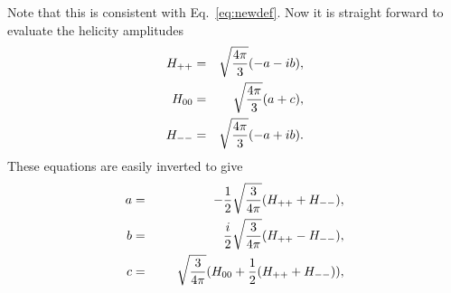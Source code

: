 Note that this is consistent with Eq.~\ref{eq:newdef}.
Now it is straight forward to evaluate the helicity amplitudes
\begin{eqnarray}
 H_{++} & = & \sqrt{4\pi\over 3}(-a-ib), \\
 H_{00} & = & \sqrt{4\pi\over 3}(a+c),\\
 H_{--} & = & \sqrt{4\pi\over 3}(-a+ib).
\end{eqnarray}
These equations are easily inverted to give
\begin{eqnarray}
 a & = & -{1\over2}\sqrt{3\over 4\pi}(H_{++}+H_{--}), \\
 b & = & \phantom{-}{i\over2}\sqrt{3\over 4\pi}(H_{++}-H_{--}), \\
 c & = & \phantom{-{1\over2}}\sqrt{3\over 4\pi}(H_{00}+{1\over 2}(H_{++}+H_{--})), \\
\end{eqnarray}

